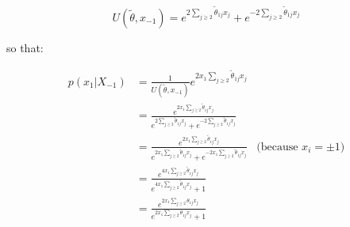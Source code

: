\documentclass[11pt]{article}
\begin{document}
$$U(\tilde \theta, x_{-1})=  e^{2 \sum_{j \ge 2} \tilde \theta_{1j} x_j} +e^{-2 \sum_{j \ge 2} \tilde \theta_{1j} x_j}$$


so that:

\begin{align*}
p(x_1 | X_{-1})
&= \frac{1}{U(\tilde \theta, x_{-1})} e^{2 x_1\sum_{j \ge 2} \tilde \theta_{1j} x_j}
\\&= \frac{e^{2 x_1\sum_{j \ge 2} \tilde \theta_{1j} x_j}}{e^{2 \sum_{j \ge 2} \tilde \theta_{1j} x_j} +  e^{-2 \sum_{j \ge 2} \tilde \theta_{1j} x_j}}
\\&= \frac{e^{2 x_1\sum_{j \ge 2} \tilde \theta_{1j} x_j}}{e^{2 x_1\sum_{j \ge 2} \tilde \theta_{1j} x_j} +  e^{-2 x_1\sum_{j \ge 2} \tilde \theta_{1j} x_j}} &\text{(because $x_i = \pm 1$)}
\\&= \frac{e^{4 x_1\sum_{j \ge 2} \tilde \theta_{1j} x_j}}{e^{4 x_1\sum_{j \ge 2} \tilde \theta_{1j} x_j} +  1}
\\&= \frac{e^{2 x_1\sum_{j \ge 2}  \theta_{1j} x_j}}{e^{2 x_1\sum_{j \ge 2}  \theta_{1j} x_j} +  1}
\end{align*}
\end{document}
